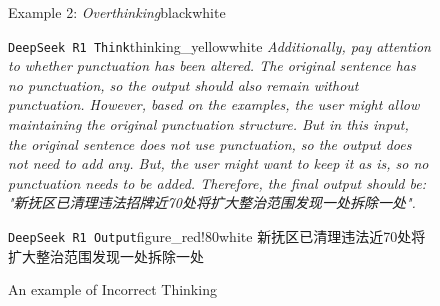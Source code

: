 \begin{figure*}[ph!]
\begin{scopebox}{Example 2: \textit{Overthinking}}{black}{white}
\begin{scopebox}{\texttt{DeepSeek\,R1 Think}}{thinking_yellow}{white}
            \qquad{}\textit{Additionally, pay attention to whether punctuation has been altered. The original sentence has no punctuation, so the output should also remain without punctuation. However, based on the examples, the user might allow maintaining the original punctuation structure. But in this input, the original sentence does not use punctuation, so the output does not need to add any. But, the user might want to keep it as is, so no punctuation needs to be added. Therefore, the final output should be: "新抚区已清理违法招牌近70处将扩大整治范围发现一处拆除一处".}\return
        \end{scopebox}
        \begin{scopebox}{\texttt{DeepSeek\,R1 Output}}{figure_red!80}{white}
            新抚区已清理违法近70处将扩大整治范围发现一处拆除一处
        \end{scopebox}
    \end{scopebox}
    \caption{
        An example of {Incorrect Thinking}
    }
    \label{fig:thinking_example_3}
\end{figure*}

